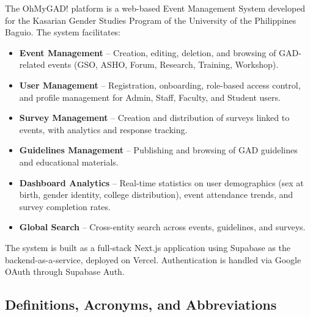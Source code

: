 \documentclass[11pt,a4paper]{article}
\begin{document}
The OhMyGAD! platform is a web-based Event Management System developed for the Kasarian Gender Studies Program of the University of the Philippines Baguio. The system facilitates:

\begin{itemize}[leftmargin=1.5em]
  \item \textbf{Event Management} -- Creation, editing, deletion, and browsing of GAD-related events (GSO, ASHO, Forum, Research, Training, Workshop).
  \item \textbf{User Management} -- Registration, onboarding, role-based access control, and profile management for Admin, Staff, Faculty, and Student users.
  \item \textbf{Survey Management} -- Creation and distribution of surveys linked to events, with analytics and response tracking.
  \item \textbf{Guidelines Management} -- Publishing and browsing of GAD guidelines and educational materials.
  \item \textbf{Dashboard Analytics} -- Real-time statistics on user demographics (sex at birth, gender identity, college distribution), event attendance trends, and survey completion rates.
  \item \textbf{Global Search} -- Cross-entity search across events, guidelines, and surveys.
\end{itemize}

The system is built as a full-stack Next.js application using Supabase as the backend-as-a-service, deployed on Vercel. Authentication is handled via Google OAuth through Supabase Auth.


\subsection{Definitions, Acronyms, and Abbreviations}
\end{document}
